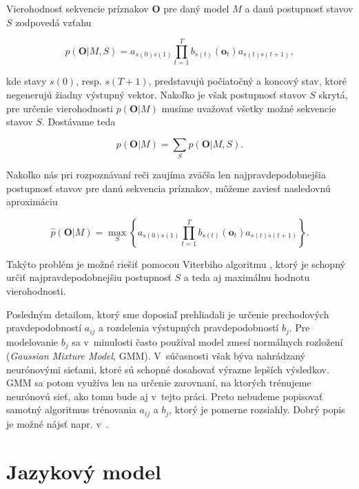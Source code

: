 Vierohodnosť sekvencie príznakov $\bm{O}$ pre daný model $M$ a danú postupnosť stavov $S$ zodpovedá vzťahu

\begin{equation}
    p(\bm{O} | M, S) =  a_{s(0)s(1)} \prod_{t=1}^T b_{s(t)}(\bm{o}_t) a_{s(t)s(t+1)},
\end{equation}

\noindent kde stavy $s(0)$, resp. $s(T+1)$, predstavujú počiatočný a koncový stav, ktoré negenerujú žiadny výstupný vektor.
Nakoľko je však postupnosť stavov $S$ skrytá, pre určenie vierohodnosti $p(\bm{O} | M)$ musíme uvažovať všetky možné sekvencie stavov $S$. Dostávame teda

\begin{equation}
    p(\bm{O} | M) = \sum_S p(\bm{O} | M, S).
\end{equation}

\noindent Nakoľko nás pri rozpoznávaní reči zaujíma zväčša len najpravdepodobnejšia postupnosť stavov pre danú sekvencia príznakov, môžeme zaviesť nasledovnú aproximáciu

\begin{equation}
    \hat{p}(\bm{O} | M) = \max_S \left\{ a_{s(0)s(1)} \prod_{t=1}^T b_{s(t)}(\bm{o}_t) a_{s(t)s(t+1)} \right\}.
\end{equation}

\noindent Takýto problém je možné riešiť pomocou Viterbiho algoritmu \cite{Rabiner1989}, ktorý je schopný určiť najpravdepodobnejšiu postupnosť $S$ a teda aj maximálnu hodnotu vierohodnosti. 

Posledným detailom, ktorý sme doposiaľ prehliadali je určenie prechodových pravdepodobností $a_{ij}$ a rozdelenia výstupných pravdepodobností $b_j$. Pre modelovanie $b_j$ sa v~minulosti často používal model zmesí normálnych rozložení (\textit{Gaussian Mixture Model}, GMM). V~súčasnosti však býva nahrádzaný neurónovými sieťami, ktoré sú schopné dosahovať výrazne lepších výsledkov. GMM sa potom využíva len na určenie zarovnaní, na ktorých trénujeme neurónovú sieť, ako tomu bude aj v~tejto práci. Preto nebudeme popisovať samotný algoritmus trénovania $a_{ij}$ a $b_j$, ktorý je pomerne rozsiahly. Dobrý popis je možné nájsť napr. v~\cite{Rabiner1989}.

\section{Jazykový model} \label{sec:language-model}

